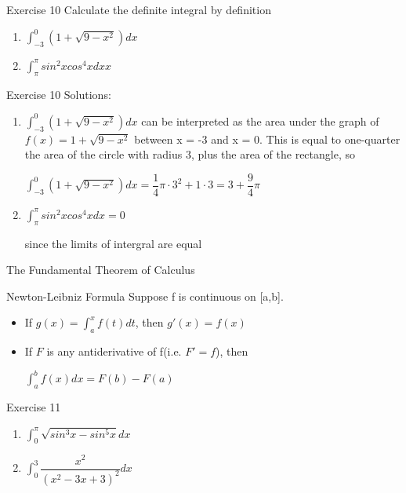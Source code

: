 \documentclass{beamer}
\begin{document}
\begin{frame}{Exercise 10}
Calculate the definite integral by definition
\begin{enumerate}
    \item $\int_{-3}^{0} (1+\sqrt{9-x^2})dx$
    \item $\int_\pi^\pi sin^2 xcos^4 xdxx$
\end{enumerate}
    
\end{frame}

\begin{frame}{Exercise 10}
Solutions:
\begin{enumerate}
    \item 
    $\int_{-3}^{0} (1+\sqrt{9-x^2})dx$ can be interpreted as the area under the graph of $f(x) = 1+\sqrt{9-x^2}$ between x = -3 and x = 0. This is equal to one-quarter the area of the circle with radius 3, plus the area of the rectangle, so
    
    $\int_{-3}^{0} (1+\sqrt{9-x^2})dx = \dfrac{1}{4}\pi\cdot3^2 + 1\cdot 3 = 3 + \dfrac{9}{4}\pi$
    \item $\int_\pi^\pi sin^2 xcos^4 xdx = 0$
    
    since the limits of intergral are equal
\end{enumerate}
\end{frame}

\begin{frame}{The Fundamental Theorem of Calculus}
\begin{block}{Newton-Leibniz Formula}
Suppose f is continuous on [a,b].
\begin{itemize}
    \item If $g(x) = \int_a^x f(t)dt$, then $g'(x) = f(x)$
    \item If $F$ is any antiderivative of f(i.e. $F' = f$), then 
    
    $\int_a^b f(x)dx = F(b) - F(a)$
\end{itemize}
\end{block}
\end{frame}

\begin{frame}{Exercise 11}
\begin{enumerate}
    \item $\int_{0}^{\pi}\sqrt{sin^3x - sin^5x}dx$
    \item  $\int_{0}^{3}\dfrac{x^2}{(x^2 -3x +3)^2}dx$
\end{enumerate}
\end{frame}
\end{document}
